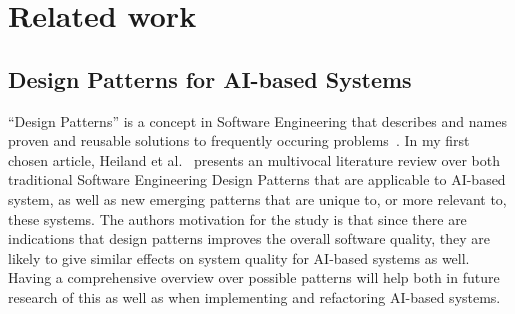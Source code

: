 \documentclass[a4paper,twocolumn]{article}
\begin{document}
\section{Related work}

% 

\subsection{Design Patterns for AI-based Systems}

``Design Patterns'' is a concept in Software Engineering that describes and
names proven and reusable solutions to frequently occuring
problems~\cite{Gamma2001}. In my first chosen article, Heiland et
al.~\cite{heiland_design_2023} presents an multivocal literature review over both traditional
Software Engineering Design Patterns that are applicable to AI-based system, as
well as new emerging patterns that are unique to, or more relevant to, these
systems. The authors motivation for the study is that since there are
indications that design patterns improves the overall software quality, they are
likely to give similar effects on system quality for AI-based systems as well.
Having a comprehensive overview over possible patterns will help both in future
research of this as well as when implementing and refactoring AI-based systems.
\end{document}
